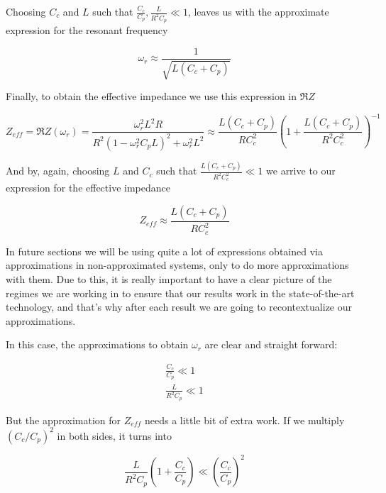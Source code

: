 \documentclass[../main.tex]{subfiles}
\begin{document}
Choosing \(C_{c}\) and \(L\) such that
\(\frac{C_{c}}{C_{p}}, \frac{L}{R^2 C_{p}} \ll 1\), leaves us with the
approximate expression for the resonant frequency

\begin{equation}
\label{eq:Wr}
\omega_{r} \approx \frac{1}{\sqrt{L (C_{c} + C_{p})}}
\end{equation}

Finally, to obtain the effective impedance we use this expression in \(\Re Z\)

\begin{equation}
\label{eq:ExactZeff}
    Z_{eff} = \Re Z(\omega_{r}) =
    \frac{\omega_{r}^2 L^2 R}{R^2(1-\omega_{r}^2C_{p}L)^2 + \omega_{r}^2 L^2}
    \approx \frac{L (C_{c} + C_{p})}{R C_{c}^2}
      \left(1 + \frac{L (C_{c} + C_{p})}{R^2 C_{c}^2}\right)^{-1}
\end{equation}

And by, again, choosing \(L\) and \(C_{c}\) such that
\(\frac{L (C_{c} + C_{p})}{R^2 C_{c}^2} \ll 1\) we arrive to our expression for
the effective impedance

\begin{equation}
\label{eq:Zeff}
    Z_{eff} \approx \frac{L (C_{c} + C_{p})}{R C_{c}^2}
\end{equation}

In future sections we will be using quite a lot of expressions obtained via
approximations in non-approximated systems, only to do more approximations
with them. Due to this, it is really important to have a clear picture of
the regimes we are working in to ensure that our results work in the
state-of-the-art technology, and that's why after each result we are going to
recontextualize our approximations.

In this case, the approximations to obtain \(\omega_{r}\) are clear and
straight forward:

\begin{gather}
    \frac{C_{c}}{C_{p}} \ll 1 \label{eq:ApproxCcWr}\\
    \frac{L}{R^2 C_{p}} \ll 1 \label{eq:ApproxLWr}
\end{gather}

But the approximation for \(Z_{eff}\) needs a little bit of extra work. If we
multiply \((C_{c} / C_{p})^2\) in both sides, it turns into

\begin{equation}
\label{eq:ProtoZeffCond}
    \frac{L}{R^2 C_{p}} \left(1 + \frac{C_{c}}{C_{p}}\right) \ll
    \left(\frac{C_{c}}{C_{p}}\right)^2
\end{equation}
\end{document}
